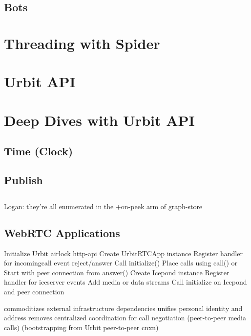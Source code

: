 \subsection{Bots}

\section{Threading with Spider}

\section{Urbit API}

\section{Deep Dives with Urbit API}

\subsection{Time (Clock)}

\subsection{Publish}

\subsection{\graphstore}

Logan:  they’re all enumerated in the +on-peek arm of graph-store




\subsection{WebRTC Applications}

Initialize Urbit airlock http-api
Create UrbitRTCApp instance
Register handler for incomingcall event
  reject/answer
Call initialize()
Place calls using call()
or Start with peer connection from answer()
Create Icepond instance
Register handler for iceserver events
Add media or data streams
Call initialize on Icepond and peer connection

commoditizes external infrastructure dependencies
unifies personal identity and address
removes centralized coordination for call negotiation (peer-to-peer media calls)
(bootstrapping from Urbit peer-to-peer cnxn)


